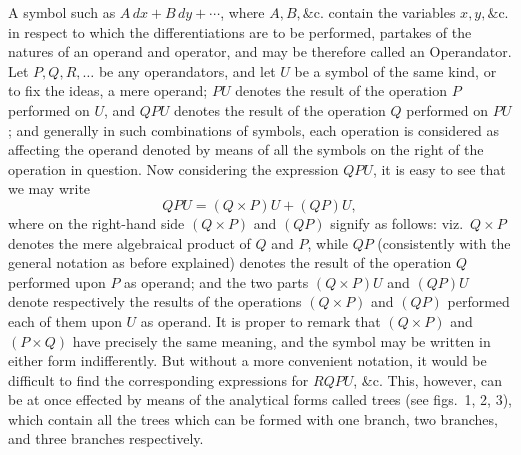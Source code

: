 \documentclass[12pt,a4paper]{article}
\theoremstyle{plain}
\begin{document}
\medskip

\noindent A symbol such as $A\,dx+B\,dy+\cdots$, where $A,B,\&\mathrm{c}.$ contain the variables $x,y,\&\mathrm{c}.$ in respect to which the differentiations are to be performed, partakes of the natures of an operand and operator, and may be therefore called an Operandator. Let $P,Q,R,\ldots$ be any operandators, and let $U$ be a symbol of the same kind, or to fix the ideas, a mere operand; $PU$ denotes the result of the operation $P$ performed on $U$, and $QPU$ denotes the result of the operation $Q$ performed on $PU$; and generally in such combinations of symbols, each operation is considered as affecting the operand denoted by means of all the symbols on the right of the operation in question. Now considering the expression $QPU$, it is easy to see that we may write
\[
QPU=(Q\times P)U+(QP)U,
\]
where on the right-hand side $(Q\times P)$ and $(QP)$ signify as follows: viz.\ $Q\times P$ denotes the mere algebraical product of $Q$ and $P$, while $QP$ (consistently with the general notation as before explained) denotes the result of the operation $Q$ performed upon $P$ as operand; and the two parts $(Q\times P)U$ and $(QP)U$ denote respectively the results of the operations $(Q\times P)$ and $(QP)$ performed each of them upon $U$ as operand. It is proper to remark that $(Q\times P)$ and $(P\times Q)$ have precisely the same meaning, and the symbol may be written in either form indifferently. But without a more convenient notation, it would be difficult to find the corresponding expressions for $RQPU$, \&c. This, however, can be at once effected by means of the analytical forms called trees (see figs.~1, 2, 3), which contain all the trees which can be formed with one branch, two branches, and three branches respectively.

\medskip
\end{document}
